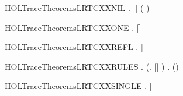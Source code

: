 \newcommand{\HOLTraceTheoremsLRTCXXLRTC}{\UseVerbatim{HOLTraceTheoremsLRTCXXLRTC}}
\begin{SaveVerbatim}{HOLTraceTheoremsLRTCXXNIL}
\HOLTokenTurnstile{} \HOLSymConst{\HOLTokenForall{}}  .    []  \HOLSymConst{\HOLTokenEquiv{}} ( \HOLSymConst{=} )
\end{SaveVerbatim}
\newcommand{\HOLTraceTheoremsLRTCXXNIL}{\UseVerbatim{HOLTraceTheoremsLRTCXXNIL}}
\begin{SaveVerbatim}{HOLTraceTheoremsLRTCXXONE}
\HOLTokenTurnstile{} \HOLSymConst{\HOLTokenForall{}}   .    []  \HOLSymConst{\HOLTokenEquiv{}}    
\end{SaveVerbatim}
\newcommand{\HOLTraceTheoremsLRTCXXONE}{\UseVerbatim{HOLTraceTheoremsLRTCXXONE}}
\begin{SaveVerbatim}{HOLTraceTheoremsLRTCXXREFL}
\HOLTokenTurnstile{} \HOLSymConst{\HOLTokenForall{}}.    [] 
\end{SaveVerbatim}
\newcommand{\HOLTraceTheoremsLRTCXXREFL}{\UseVerbatim{HOLTraceTheoremsLRTCXXREFL}}
\begin{SaveVerbatim}{HOLTraceTheoremsLRTCXXRULES}
\HOLTokenTurnstile{} \HOLSymConst{\HOLTokenForall{}}.
       (\HOLSymConst{\HOLTokenForall{}}.    [] ) \HOLSymConst{\HOLTokenConj{}}
       \HOLSymConst{\HOLTokenForall{}}    .     \HOLSymConst{\HOLTokenConj{}}      \HOLSymConst{\HOLTokenImp{}}    (\HOLSymConst{::}) 
\end{SaveVerbatim}
\newcommand{\HOLTraceTheoremsLRTCXXRULES}{\UseVerbatim{HOLTraceTheoremsLRTCXXRULES}}
\begin{SaveVerbatim}{HOLTraceTheoremsLRTCXXSINGLE}
\HOLTokenTurnstile{} \HOLSymConst{\HOLTokenForall{}}   .     \HOLSymConst{\HOLTokenImp{}}    [] 
\end{SaveVerbatim}
